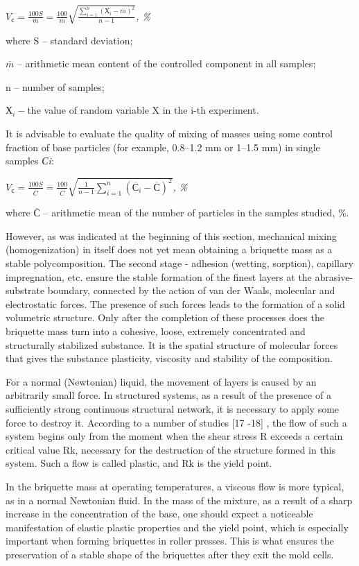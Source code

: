 \(V_{с} = \frac{100S}{\overline{m}} = \frac{100}{\overline{m}}\sqrt{\frac{\sum_{i = 1}^{n}\left( Х_{i} - \overline{m} \right)^{2}}{n - 1}}\)\emph{,
\%}

where S -- standard deviation;

\(\overline{m}\) -- arithmetic mean content of the controlled component
in all samples;

n -- number of samples;

\(Х_{i} -\)the value of random variable X in the i-th experiment.

It is advisable to evaluate the quality of mixing of masses using some
control fraction of base particles (for example, 0.8--1.2 mm or 1--1.5
mm) in single samples \emph{Сi}:

\(V_{с} = \frac{100S}{\overline{C}} = \frac{100}{\overline{C}}\sqrt{\frac{1}{n - 1}\sum_{i = 1}^{n}\left( {\overline{С}}_{i} - \overline{С} \right)^{2}}\)\emph{,
\%}

where \(\overline{С}\) -- arithmetic mean of the number of particles in
the samples studied, \%.

However, as was indicated at the beginning of this section, mechanical
mixing (homogenization) in itself does not yet mean obtaining a
briquette mass as a stable polycomposition. The second stage - adhesion
(wetting, sorption), capillary impregnation, etc. ensure the stable
formation of the finest layers at the abrasive-substrate boundary,
connected by the action of van der Waals, molecular and electrostatic
forces. The presence of such forces leads to the formation of a solid
volumetric structure. Only after the completion of these processes does
the briquette mass turn into a cohesive, loose, extremely concentrated
and structurally stabilized substance. It is the spatial structure of
molecular forces that gives the substance plasticity, viscosity and
stability of the composition.

For a normal (Newtonian) liquid, the movement of layers is caused by an
arbitrarily small force. In structured systems, as a result of the
presence of a sufficiently strong continuous structural network, it is
necessary to apply some force to destroy it. According to a number of
studies {[}17 -18{]} , the flow of such a system begins only from the
moment when the shear stress R exceeds a certain critical value Rk,
necessary for the destruction of the structure formed in this system.
Such a flow is called plastic, and Rk is the yield point.

In the briquette mass at operating temperatures, a viscous flow is more
typical, as in a normal Newtonian fluid. In the mass of the mixture, as
a result of a sharp increase in the concentration of the base, one
should expect a noticeable manifestation of elastic plastic properties
and the yield point, which is especially important when forming
briquettes in roller presses. This is what ensures the preservation of a
stable shape of the briquettes after they exit the mold cells.

